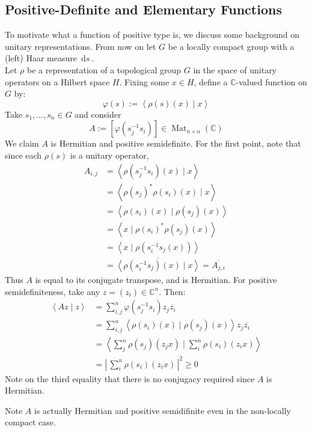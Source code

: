 \documentclass[11pt, x11names]{book}
\newcommand{\cc}{\mathbb{C}}
\renewcommand{\bar}[1]{\overline{#1}}
\newcommand{\brangle}[1]{\left\langle #1 \right\rangle}
\newcommand{\abs}[1]{\left| \, #1  \,\right|}
\newcommand{\sqbrack}[1]{\left[ #1 \right]}
\newcommand{\inv}[1]{#1^{-1}}
\DeclareMathOperator{\mat}{Mat}
\newcommand{\ds}{\, \mathrm{d}s \ }
\begin{document}
\subsection{Positive-Definite and Elementary Functions}
\label{subsection: Pos-Def and Elementary Funcs}
To motivate what a function of positive type is, we discuss some background on unitary representations. From now on let $G$ be a locally compact group with a (left) Haar measure $\ds$.\\

Let $\rho$ be a representation of a topological group $G$ in the space of unitary operators on a Hilbert space $H$. Fixing some $x \in H$, define a $\cc$-valued function on $G$ by:
\begin{equation*}
    \varphi(s) := \brangle{\rho(s)(x) \mid x}
\end{equation*}
Take $s_1, \ldots, s_n \in G$ and consider
\begin{equation*}
    A := \sqbrack{\varphi(\inv{s_j}s_i)} \in \mat_{n \times n}(\cc)
\end{equation*}
We claim $A$ is Hermitian and positive semidefinite. For the first point, note that since each $\rho(s)$ is a unitary operator,
\begin{equation*}
\begin{split}
    A_{i, j} &= \brangle{\rho(\inv{s_j}s_i)(x) \mid x}\\ 
    &= \brangle{\rho(s_j)^* \rho(s_i)(x) \mid x}\\
    &= \brangle{\rho(s_i)(x) \mid \rho(s_j)(x)}\\
    &= \brangle{x \mid \rho(s_i)^* \rho(s_j)(x)}\\
    &= \brangle{x \mid \rho(\inv{s_i}s_j(x))}\\
    &= \bar{\brangle{\rho(\inv{s_i}s_j)(x) \mid x}} = \bar{A_{j, i}}
\end{split}
\end{equation*}
Thus $A$ is equal to its conjugate transpose, and is Hermitian. For positive semidefiniteness, take any $z = (z_i) \in \cc^n$. Then:
\begin{equation*}
    \begin{split}
        \brangle{Az \mid z} &= \sum^n_{i, j} \varphi(\inv{s_j}s_i)z_j \bar{z_i}\\
        &= \sum^n_{i, j} \brangle{\rho(s_i)(x) \mid \rho(s_j)(x)}z_j \bar{z_i}\\
        &= \brangle{\sum^n_{j} \rho(s_j)(z_j x) \mid \sum^n_{i} \rho(s_i)(z_ix)}\\
        &= \abs{\sum^n_i \rho(s_i)(z_i x)}^2 \geq 0
    \end{split}
\end{equation*}
Note on the third equality that there is no conjugacy required since $A$ is Hermitian.
\begin{remark}
    Note $A$ is actually Hermitian and positive semidifinite even in the non-locally compact case.
\end{remark}
\end{document}
